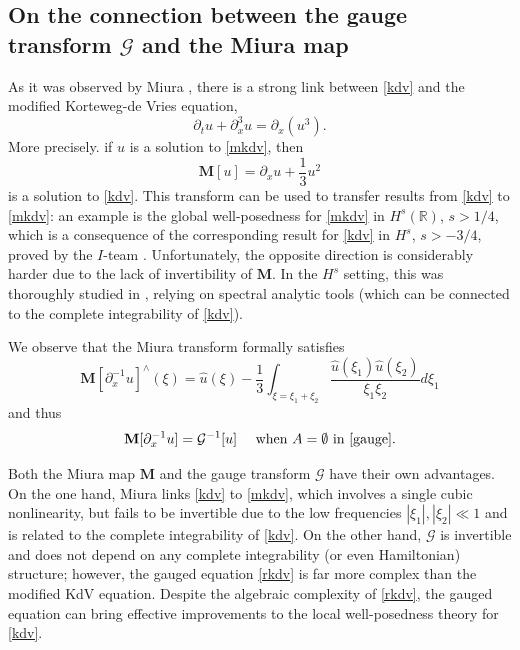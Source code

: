 \documentclass[%
11pt,  reqno]{amsart}
\newcommand{\5}{\textup{V}}
\newcommand{\dx}{\partial_x}
\theoremstyle{remark}
\newcommand{\R}{\mathbb{R}}
\newcommand{\MMb}{\mathbf{M}}
\newcommand{\Gc}{\mathcal{G}}
\numberwithin{equation}{section}
\numberwithin{theorem}{section}
\begin{document}
    \subsection{On the connection between the gauge transform $\Gc$ and the Miura map}
		As it was observed by Miura \cite{Miura}, there is a strong link between \eqref{kdv} and the modified Korteweg-de Vries equation,
		\begin{equation}
			\tag{mKdV}\label{mkdv}
			\partial_t u + \partial_x^3 u = \partial_x(u^3).
		\end{equation}
		More precisely. if $u$ is a solution to \eqref{mkdv}, then
		\begin{equation}\label{eq:defiMiura}
			\MMb[u]=\partial_x u +\frac{1}{3}u^2
		\end{equation}
		is a solution to \eqref{kdv}. This transform can be used to transfer results from \eqref{kdv} to \eqref{mkdv}: an example is the global well-posedness for \eqref{mkdv} in $H^s(\R)$, $s>1/4$, which is a consequence of the corresponding result for \eqref{kdv} in $H^s$, $s>-3/4$, proved by the $I$-team \cite{CKSTT_sharp_kdv}. Unfortunately, the opposite direction is considerably harder due to the lack of invertibility of $\MMb$. In the $H^s$ setting, this was thoroughly studied in  \cite{BuckmasterKoch, KPST_miura}, relying on spectral analytic tools (which can be connected to the complete integrability of \eqref{kdv}).
		
		We observe that the Miura transform formally satisfies
		\begin{equation}\label{eq:miura2}
			{\MMb[\partial_x^{-1}u]}^\wedge(\xi) = \widehat{u}(\xi)-\frac{1}{3}\int_{\xi=\xi_1+\xi_2} \frac{\widehat{u}(\xi_1)\widehat{u}(\xi_2)}{\xi_1\xi_2}d\xi_1
		\end{equation}
        and thus
        \begin{equation}
\MMb[\dx^{-1} u]=\Gc^{-1}[u]\quad \mbox{ when }A=\emptyset\mbox{ in }\eqref{gauge}.
        \end{equation}
        
        Both the Miura map $\MMb$ and the gauge transform $\Gc$ have their own advantages. On the one hand, Miura links \eqref{kdv} to \eqref{mkdv}, which involves a single cubic nonlinearity, but fails to be invertible due to the low frequencies $|\xi_1|, |\xi_2|\ll 1$ and is related to the complete integrability of \eqref{kdv}. On the other hand, $\Gc$ is invertible and does not depend on any complete integrability (or even Hamiltonian) structure; however, the gauged equation \eqref{rkdv} is far more complex than the modified KdV equation. Despite the algebraic complexity of \eqref{rkdv}, the gauged equation can bring effective improvements to the local well-posedness theory for \eqref{kdv}.
\end{document}
